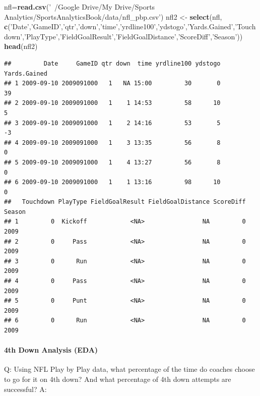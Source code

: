 \documentclass[]{article}
\newenvironment{Shaded}{\begin{snugshade}}{\end{snugshade}}
\newcommand{\KeywordTok}[1]{\textcolor[rgb]{0.13,0.29,0.53}{\textbf{#1}}}
\newcommand{\NormalTok}[1]{#1}
\newcommand{\StringTok}[1]{\textcolor[rgb]{0.31,0.60,0.02}{#1}}
\let\oldparagraph\paragraph
\renewcommand{\paragraph}[1]{\oldparagraph{#1}\mbox{}}
\begin{document}
\begin{Shaded}
\begin{Highlighting}[]
\NormalTok{nfl=}\KeywordTok{read.csv}\NormalTok{(}\StringTok{'~/Google Drive/My Drive/Sports Analytics/SportsAnalyticsBook/data/nfl_pbp.csv'}\NormalTok{)}
\NormalTok{nfl2 <-}\StringTok{ }\KeywordTok{select}\NormalTok{(nfl, }\KeywordTok{c}\NormalTok{(}\StringTok{'Date'}\NormalTok{,}\StringTok{'GameID'}\NormalTok{,}\StringTok{'qtr'}\NormalTok{,}\StringTok{'down'}\NormalTok{,}\StringTok{'time'}\NormalTok{,}\StringTok{'yrdline100'}\NormalTok{,}\StringTok{'ydstogo'}\NormalTok{,}\StringTok{'Yards.Gained'}\NormalTok{,}\StringTok{'Touchdown'}\NormalTok{,}\StringTok{'PlayType'}\NormalTok{,}\StringTok{'FieldGoalResult'}\NormalTok{,}\StringTok{'FieldGoalDistance'}\NormalTok{,}\StringTok{'ScoreDiff'}\NormalTok{,}\StringTok{'Season'}\NormalTok{))}
\KeywordTok{head}\NormalTok{(nfl2)}
\end{Highlighting}
\end{Shaded}

\begin{verbatim}
##         Date     GameID qtr down  time yrdline100 ydstogo Yards.Gained
## 1 2009-09-10 2009091000   1   NA 15:00         30       0           39
## 2 2009-09-10 2009091000   1    1 14:53         58      10            5
## 3 2009-09-10 2009091000   1    2 14:16         53       5           -3
## 4 2009-09-10 2009091000   1    3 13:35         56       8            0
## 5 2009-09-10 2009091000   1    4 13:27         56       8            0
## 6 2009-09-10 2009091000   1    1 13:16         98      10            0
##   Touchdown PlayType FieldGoalResult FieldGoalDistance ScoreDiff Season
## 1         0  Kickoff            <NA>                NA         0   2009
## 2         0     Pass            <NA>                NA         0   2009
## 3         0      Run            <NA>                NA         0   2009
## 4         0     Pass            <NA>                NA         0   2009
## 5         0     Punt            <NA>                NA         0   2009
## 6         0      Run            <NA>                NA         0   2009
\end{verbatim}

\hypertarget{th-down-analysis-eda}{%
\paragraph{4th Down Analysis (EDA)}\label{th-down-analysis-eda}}

Q: Using NFL Play by Play data, what percentage of the time do coaches
choose to go for it on 4th down? And what percentage of 4th down
attempts are successful? A:
\end{document}
